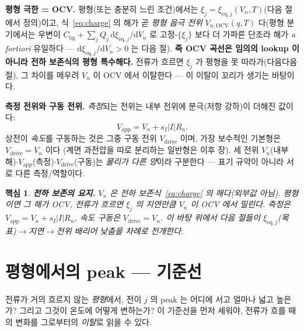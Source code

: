 \documentclass[11pt,a4paper]{article}
\newtheorem*{keybox}{핵심}
\newcommand{\dd}{\mathrm{d}}
\newcommand{\eq}{\mathrm{eq}}
\newcommand{\app}{\mathrm{app}}
\newcommand{\drive}{\mathrm{drive}}
\newcommand{\bg}{\mathrm{bg}}
\newcommand{\OCV}{\mathrm{OCV}}
\begin{document}
\textbf{평형 극한 = OCV.} 평형(또는 충분히 느린 조건)에서는 $\xi_j=\xi_{\eq,j}(V_n,T)$(다음 절에서 정의)이고,
식~\eqref{eq:charge} 의 해가 곧 \emph{평형 음극 전위} $V_{n,\OCV}(q,T)$ 다(평형 분기에서는 우변이 $C_\bg+\sum_j
Q_j\,\dd\xi_{\eq,j}/\dd V_n$ 로 고정-$\{\xi_j\}$ 보다 더 가파른 단조라 해가 \emph{a fortiori} 유일하다 —
$\dd\xi_{\eq,j}/\dd V_n>0$ 는 다음 절). \textbf{즉 OCV 곡선은 임의의
lookup 이 아니라 전하 보존식의 평형 특수해다.} 전류가 흐르면 $\xi_j$ 가 평형을 못 따라가(다음다음 절), 그
차이를 메우려 $V_n$ 이 OCV 에서 이탈한다 — 이 이탈이 꼬리가 생기는 바탕이다.

\textbf{측정 전위와 구동 전위.} \emph{측정}되는 전위는 내부 전위에 분극(저항 강하)이 더해진 값이다:
\begin{equation}
V_\app=V_n+s_I|I|R_n.
\label{eq:vapp}
\end{equation}
상전이 \emph{속도}를 구동하는 것은 그중 구동 전위 $V_\drive$ 이며, 가장 보수적인 기본형은 $V_\drive=V_n$ 이다
(계면 과전압을 따로 분리하는 일반형은 이후 장). 세 전위 $V_n$(내부 해)$\cdot V_\app$(측정)$\cdot V_\drive$(구동)는
\emph{물리가 다른 양}이라 구분한다 — 표기 규약이 아니라 서로 다른 측정/역할이다.

\begin{keybox}
\textbf{전하 보존의 요지.} $V_n$ 은 전하 보존식~\eqref{eq:charge} 의 해다(외부값 아님). 평형이면 그 해가 OCV,
전류가 흐르면 $\xi_j$ 의 지연만큼 $V_n$ 이 OCV 에서 밀린다. 측정은 $V_\app=V_n+s_I|I|R_n$, 속도 구동은
$V_\drive=V_n$. 이 바탕 위에서 다음 절들이 $\xi_{\eq,j}$(목표)$\to$지연$\to$전위 배리어 낮춤을 차례로 전개한다.
\end{keybox}

\section{평형에서의 peak — 기준선}\label{sec:eqpeak}
전류가 거의 흐르지 않는 \emph{평형}에서, 전이 $j$ 의 peak 는 어디에 서고 얼마나 넓고 높은가? 그리고
그것이 온도에 어떻게 변하는가? 이 기준선을 먼저 세워야, 전류가 흐를 때의 변화를 그로부터의 \emph{이탈}로 읽을
수 있다.
\end{document}
